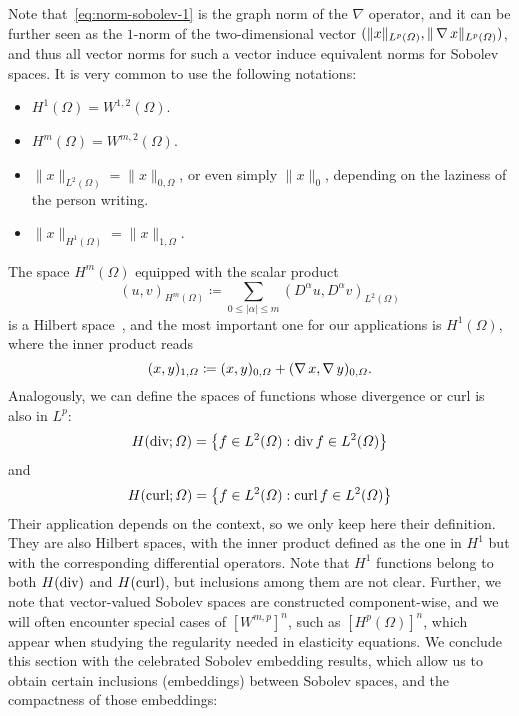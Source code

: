 Note that~\eqref{eq:norm-sobolev-1} is the graph norm of the $\nabla$ operator, and it can be further seen as the $1$-norm of the two-dimensional vector $(\|x\|_{L^p(\Omega)}, \|\operatorname{\nabla} x\|_{L^p(\Omega)})$, and thus all vector norms for such a vector induce equivalent norms for Sobolev spaces. It is very common to use the following notations:   
\begin{itemize}
    \item $H^1(\Omega) = W^{1,2}(\Omega)$.
    \item $H^m(\Omega) = W^{m,2}(\Omega)$.
    \item $\| x \|_{L^2(\Omega)} = \| x \|_{0,\Omega}$, or even simply $ \| x\|_0$, depending on the laziness of the person writing.
    \item $\| x \|_{H^1(\Omega)} = \|x\|_{1,\Omega}$.
\end{itemize}
The space $H^m(\Omega)$ equipped with the scalar product 
\begin{equation}
    (u,v)_{H^m(\Omega)} \coloneqq \sum_{0\leq |\alpha|\leq m}(D^\alpha u, D^\alpha v)_{L^2(\Omega)}
\end{equation}
is a Hilbert space~\cite{BrezisFA}, and the most important one for our applications is $H^1(\Omega)$, where the inner product reads
\begin{equation}
    (x,y)_{1,\Omega} \coloneqq (x,y)_{0,\Omega} + (\operatorname{\nabla} x, \operatorname{\nabla} y)_{0,\Omega}.
\end{equation}
Analogously, we can define the spaces of functions whose divergence or curl is also in $L^p$:
\begin{equation}\label{eq:def-hdiv}
    H(\operatorname{\text{div}}; \Omega) = \left\{f\in L^2(\Omega): \operatorname{\text{div}} f \in L^2(\Omega)\right\}
\end{equation}
and    
\begin{equation}\label{eq:def-hcurl}
    H(\operatorname{\text{curl}}; \Omega) = \left\{f\in L^2(\Omega): \operatorname{\text{curl}} f \in L^2(\Omega)\right\}
\end{equation}
Their application depends on the context, so we only keep here their definition. They are also Hilbert spaces, with the inner product defined as the one in $H^1$ but with the corresponding differential operators. Note that $H^1$ functions belong to both $H(\operatorname{\text{div}})$ and $H(\operatorname{\text{curl}})$, but inclusions among them are not clear. Further, we note that vector-valued Sobolev spaces are constructed component-wise, and we will often encounter special cases of $[W^{m,p}]^n$, such as $[H^p(\Omega)]^n$, which appear when studying the regularity needed in elasticity equations. 
We conclude this section with the celebrated Sobolev embedding results, which allow us to obtain certain inclusions (embeddings) between Sobolev spaces, and the compactness of those embeddings: 
